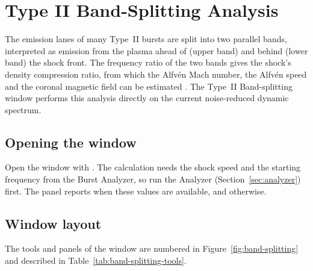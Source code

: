 \chapter{Type II Band-Splitting Analysis}
\label{ch:band-splitting}

The emission lanes of many Type~II bursts are split into two parallel bands, interpreted
as emission from the plasma ahead of (upper band) and behind (lower band) the shock front.
The frequency ratio of the two bands gives the shock's density compression ratio, from
which the Alfvén Mach number, the Alfvén speed and the coronal magnetic field can be
estimated \parencite{vrsnak2002}. The Type~II Band-splitting window performs this analysis
directly on the current noise-reduced dynamic spectrum.

\section{Opening the window}

Open the window with . The calculation needs the shock speed and the starting frequency from the
Burst Analyzer, so run the Analyzer (Section~\ref{sec:analyzer}) first. The
 panel reports  when these
values are available, and  otherwise.

\section{Window layout}

The tools and panels of the window are numbered in Figure~\ref{fig:band-splitting} and
described in Table~\ref{tab:band-splitting-tools}.


